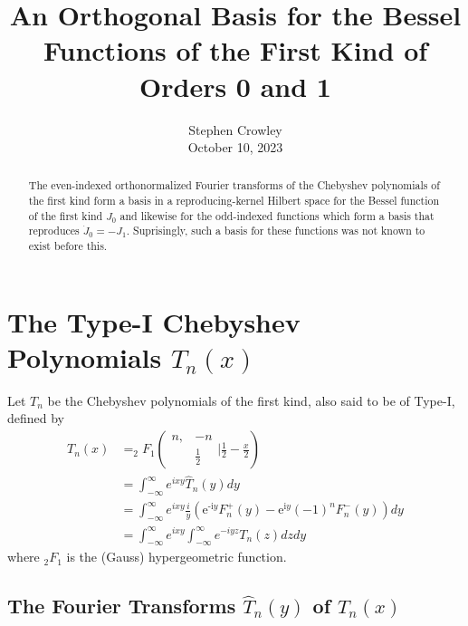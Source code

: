 \documentclass{article}
\newcommand{\tmaffiliation}[1]{\\ #1}
\newcommand{\tmstrong}[1]{\textbf{#1}}
\begin{document}
\title{{\tmstrong{An Orthogonal Basis for the Bessel Functions of the First
Kind of Orders 0 and 1}}}

\author{
  Stephen Crowley
  \tmaffiliation{October 10, 2023}
}

\maketitle

\begin{abstract}
  The even-indexed orthonormalized Fourier transforms of the Chebyshev
  polynomials of the first kind form a basis in a reproducing-kernel Hilbert
  space for the Bessel function of the first kind $J_0$ and likewise for the
  odd-indexed functions which form a basis that reproduces $\dot{J}_0 = -
  J_1$. Suprisingly, such a basis for these functions was not known to exist
  before this.
\end{abstract}

{\tableofcontents}

\section{The Type-I Chebyshev Polynomials $T_n (x)$}

Let $T_n$ be the Chebyshev polynomials of the first kind, also said to be of
Type-I, defined by
\begin{equation}
  \begin{array}{ll}
    T_n (x) & =_2 F_1 \left( \begin{array}{cc}
      n, & - n\\
      & \frac{1}{2}
    \end{array} | \frac{1}{2} - \frac{x}{2} \right)\\
    & = \int_{- \infty}^{\infty} e^{ix y}  \hat{T}_n (y) dy\\
    & = \int_{- \infty}^{\infty} e^{ix y}  \frac{i}{y} 
    (\mathrm{e}^{\textrm{-i} y}  F^+_n (y) - \mathrm{e}^{\mathrm{i} y}  (-
    1)^n  F_n^- (y)) dy\\
    & = \int_{- \infty}^{\infty} e^{ix y}  \int_{- \infty}^{\infty} e^{- iy
    z} T_n (z) dz dy
  \end{array}
\end{equation}
where $_2 F_1$ is the (Gauss) hypergeometric function.
{\cite[(13.140)]{ArfkenWeber2005}}

\subsection{The Fourier Transforms $\hat{T}_n (y)$ of $T_n (x)$}
\end{document}

